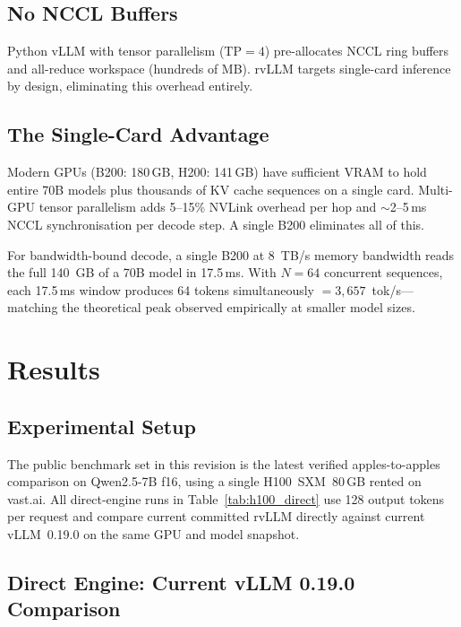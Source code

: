 \subsection{No NCCL Buffers}

Python vLLM with tensor parallelism ($\text{TP}\!=\!4$) pre-allocates NCCL ring
buffers and all-reduce workspace (hundreds of MB). rvLLM targets single-card
inference by design, eliminating this overhead entirely.

\subsection{The Single-Card Advantage}

Modern GPUs (B200: 180\,GB, H200: 141\,GB) have sufficient VRAM to hold entire
70B models plus thousands of KV cache sequences on a single card. Multi-GPU tensor
parallelism adds 5--15\% NVLink overhead per hop and $\sim$2--5\,ms NCCL
synchronisation per decode step. A single B200 eliminates all of this.

For bandwidth-bound decode, a single B200 at 8~TB/s memory bandwidth reads the
full 140~GB of a 70B model in 17.5\,ms. With $N\!=\!64$ concurrent sequences,
each 17.5\,ms window produces 64 tokens simultaneously $= 3{,}657$~tok/s---matching
the theoretical peak observed empirically at smaller model sizes.

\section{Results}
\label{sec:results}

\subsection{Experimental Setup}

The public benchmark set in this revision is the latest verified apples-to-apples
comparison on Qwen2.5-7B f16, using a single H100~SXM~80\,GB rented on vast.ai.
All direct-engine runs in Table~\ref{tab:h100_direct} use 128 output tokens per
request and compare current committed rvLLM directly against current vLLM~0.19.0
on the same GPU and model snapshot.

\subsection{Direct Engine: Current vLLM 0.19.0 Comparison}


